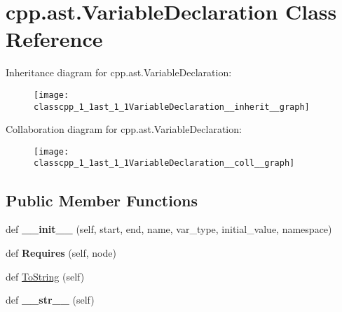 \hypertarget{classcpp_1_1ast_1_1VariableDeclaration}{}\section{cpp.\+ast.\+Variable\+Declaration Class Reference}
\label{classcpp_1_1ast_1_1VariableDeclaration}


Inheritance diagram for cpp.\+ast.\+Variable\+Declaration\+:\nopagebreak
\begin{figure}[H]
\begin{center}
\leavevmode
\texttt{[image: classcpp\_1\_1ast\_1\_1VariableDeclaration\_\_inherit\_\_graph]}
\end{center}
\end{figure}


Collaboration diagram for cpp.\+ast.\+Variable\+Declaration\+:\nopagebreak
\begin{figure}[H]
\begin{center}
\leavevmode
\texttt{[image: classcpp\_1\_1ast\_1\_1VariableDeclaration\_\_coll\_\_graph]}
\end{center}
\end{figure}
\subsection*{Public Member Functions}
\begin{DoxyCompactItemize}
\item 
def {\bfseries \+\_\+\+\_\+init\+\_\+\+\_\+} (self, start, end, name, var\+\_\+type, initial\+\_\+value, namespace)\hypertarget{classcpp_1_1ast_1_1VariableDeclaration_adc19909b6a3b2c2978b02044634fc13f}{}\label{classcpp_1_1ast_1_1VariableDeclaration_adc19909b6a3b2c2978b02044634fc13f}

\item 
def {\bfseries Requires} (self, node)\hypertarget{classcpp_1_1ast_1_1VariableDeclaration_aaa1cae7cf191e6d561d861cd053a0bf4}{}\label{classcpp_1_1ast_1_1VariableDeclaration_aaa1cae7cf191e6d561d861cd053a0bf4}

\item 
def \hyperlink{classcpp_1_1ast_1_1VariableDeclaration_a047aa4afddf7b7823a4095cea9477a21}{To\+String} (self)
\item 
def {\bfseries \+\_\+\+\_\+str\+\_\+\+\_\+} (self)\hypertarget{classcpp_1_1ast_1_1VariableDeclaration_a9f5c15731d1bdd8fe14c2a575e2f4fe6}{}\label{classcpp_1_1ast_1_1VariableDeclaration_a9f5c15731d1bdd8fe14c2a575e2f4fe6}

\end{DoxyCompactItemize}

